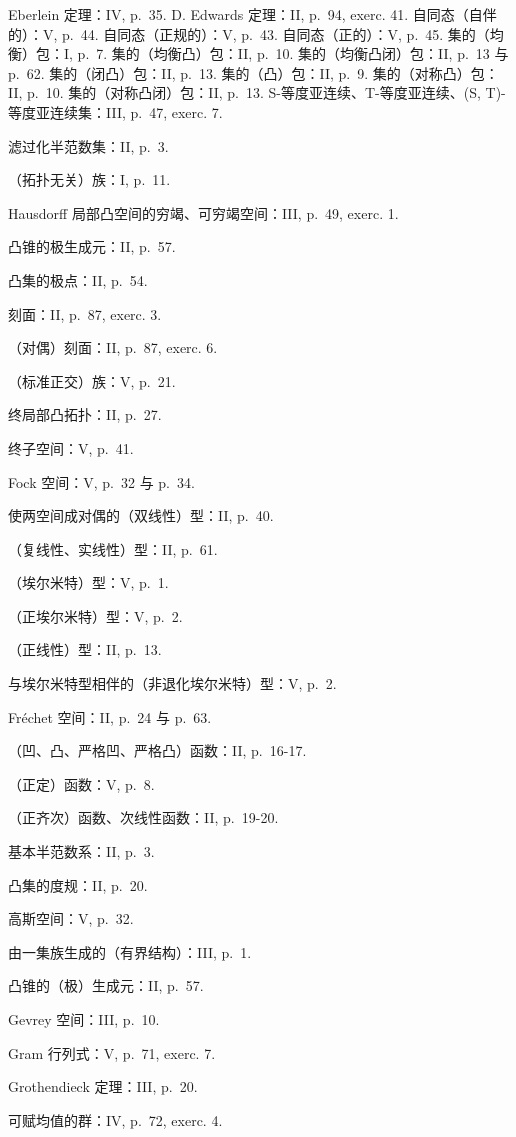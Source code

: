 Eberlein 定理：IV, p.~35. D. Edwards 定理：II, p.~94, exerc. 41. 自同态（自伴的）：V, p.~44. 自同态（正规的）：V, p.~43. 自同态（正的）：V, p.~45. 集的（均衡）包：I, p.~7. 集的（均衡凸）包：II, p.~10. 集的（均衡凸闭）包：II, p.~13 与 p.~62. 集的（闭凸）包：II, p.~13. 集的（凸）包：II, p.~9. 集的（对称凸）包：II, p.~10. 集的（对称凸闭）包：II, p.~13. S-等度亚连续、T-等度亚连续、(S, T)-等度亚连续集：III, p.~47, exerc. 7.

滤过化半范数集：II, p.~3.

（拓扑无关）族：I, p.~11.

Hausdorff 局部凸空间的穷竭、可穷竭空间：III, p.~49, exerc. 1.

凸锥的极生成元：II, p.~57.

凸集的极点：II, p.~54.

刻面：II, p.~87, exerc. 3.

（对偶）刻面：II, p.~87, exerc. 6.

（标准正交）族：V, p.~21.

终局部凸拓扑：II, p.~27.

终子空间：V, p.~41.

Fock 空间：V, p.~32 与 p.~34.

使两空间成对偶的（双线性）型：II, p.~40.

（复线性、实线性）型：II, p.~61.

（埃尔米特）型：V, p.~1.

（正埃尔米特）型：V, p.~2.

（正线性）型：II, p.~13.

与埃尔米特型相伴的（非退化埃尔米特）型：V, p.~2.

Fréchet 空间：II, p.~24 与 p.~63.

（凹、凸、严格凹、严格凸）函数：II, p.~16-17.

（正定）函数：V, p.~8.

（正齐次）函数、次线性函数：II, p.~19-20.

基本半范数系：II, p.~3.

凸集的度规：II, p.~20.

高斯空间：V, p.~32.

由一集族生成的（有界结构）：III, p.~1.

凸锥的（极）生成元：II, p.~57.

Gevrey 空间：III, p.~10.

Gram 行列式：V, p.~71, exerc. 7.

Grothendieck 定理：III, p.~20.

可赋均值的群：IV, p.~72, exerc. 4.

